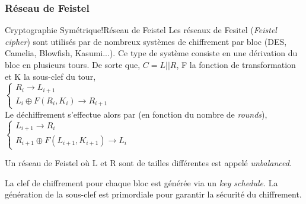 \subsubsection{Réseau de Feistel}
\begin{Define}{Cryptographie Symétrique!Réseau de Feistel}
Les réseaux de Fesitel (\textit{Feistel cipher}) sont utilisés par de nombreux systèmes de chiffrement par bloc (DES, Camelia, Blowfish, Kasumi...). Ce type de système consiste en une dérivation du bloc en plusieurs tours. De sorte que, $C=L||R$, F la fonction de transformation et K la sous-clef du tour,\\
$\left\{
\begin{array}{l}
  R_i \rightarrow L_{i+1} \\
  L_i \oplus F(R_{i}, K_{i})\rightarrow R_{i+1}
\end{array}
\right.$\\
Le déchiffrement s'effectue alors par (en fonction du nombre de \textit{rounds}),\\
$\left\{
\begin{array}{l}
  L_{i+1} \rightarrow R_{i} \\
  R_{i+1} \oplus F(L_{i+1}, K_{i+1})\rightarrow L_{i}
\end{array}
\right.$\\
\end{Define}
\begin{Warning}
Un réseau de Feistel où L et R sont de tailles différentes est appelé \textit{unbalanced}.
\end{Warning}
La clef de chiffrement pour chaque bloc est générée via un \textit{key schedule}. La génération de la sous-clef est primordiale pour garantir la sécurité du chiffrement.

